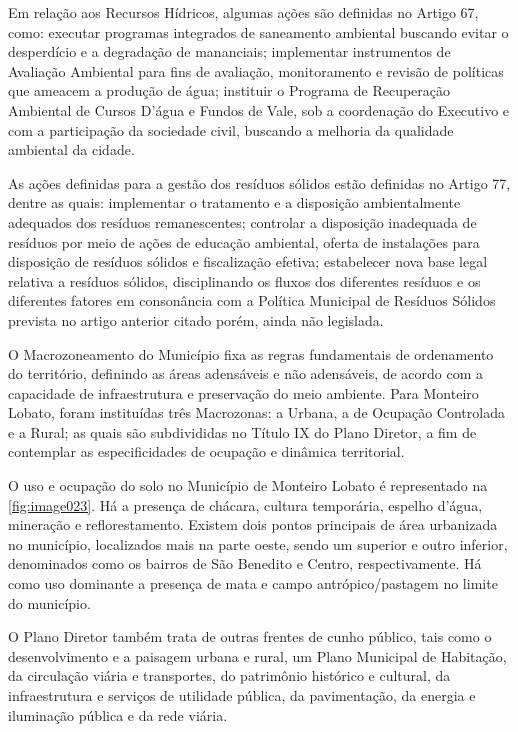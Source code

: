 Em relação aos Recursos Hídricos, algumas ações são definidas no Artigo 67, como: executar programas integrados de saneamento ambiental buscando evitar o desperdício e a degradação de mananciais; implementar instrumentos de Avaliação Ambiental para fins de avaliação, monitoramento e revisão de políticas que ameacem a produção de água; instituir o Programa de Recuperação Ambiental de Cursos D’água e Fundos de Vale, sob a coordenação do Executivo e com a participação da sociedade civil, buscando a melhoria da qualidade ambiental da cidade.

As ações definidas para a gestão dos resíduos sólidos estão definidas no Artigo 77, dentre as quais: implementar o tratamento e a disposição ambientalmente adequados dos resíduos remanescentes; controlar a disposição inadequada de resíduos por meio de ações de educação ambiental, oferta de instalações para disposição de resíduos sólidos e fiscalização efetiva; estabelecer nova base legal relativa a resíduos sólidos, disciplinando os fluxos dos diferentes resíduos e os diferentes fatores em consonância com a Política Municipal de Resíduos Sólidos prevista no artigo anterior citado porém, ainda não  legislada.

O Macrozoneamento do Município fixa as regras fundamentais de ordenamento do território, definindo as áreas adensáveis e não adensáveis, de acordo com a capacidade de infraestrutura e preservação do meio ambiente. Para Monteiro Lobato, foram instituídas três Macrozonas: a Urbana, a de Ocupação Controlada e a Rural; as quais são subdivididas no Título IX do Plano Diretor, a fim de contemplar as especificidades de ocupação e dinâmica territorial.

O uso e ocupação do solo no Município de Monteiro Lobato é representado na \autoref{fig:image023}. Há a presença de chácara, cultura temporária, espelho d’água, mineração e reflorestamento. Existem dois pontos principais de área urbanizada no município, localizados mais na parte oeste, sendo um superior e outro inferior, denominados como os bairros de São Benedito e Centro, respectivamente. Há como uso dominante a presença de mata e campo antrópico/pastagem no limite do município.

O Plano Diretor também trata de outras frentes de cunho público, tais como o desenvolvimento e a paisagem urbana e rural, um Plano Municipal de Habitação, da circulação viária e transportes, do patrimônio histórico e cultural, da infraestrutura e serviços de utilidade pública, da pavimentação, da energia e iluminação pública e da rede viária.

